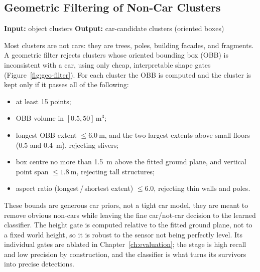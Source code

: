 \documentclass[a4paper,12pt]{report}
\begin{document}
\subsection{Geometric Filtering of Non-Car Clusters}
\label{sec:pipeline-geometric}

\noindent \textbf{Input:} object clusters \quad \textbar \quad \textbf{Output:} car-candidate clusters (oriented boxes) \vspace{0.5em}

Most clusters are not cars: they are trees, poles, building facades, and
fragments. A geometric filter rejects clusters whose oriented bounding box (OBB)
is inconsistent with a car, using only cheap, interpretable shape gates
(Figure~\ref{fig:geo-filter}). For each
cluster the OBB is computed and the cluster is kept only if it passes all
of the following:

\begin{itemize}
  \item at least \num{15} points;
  \item OBB volume in $[\num{0.5}, \num{50}]\,\si{\meter\cubed}$;
  \item longest OBB extent $\leq \SI{6.0}{\meter}$, and the two largest extents
    above small floors (\SI{0.5}{} and \SI{0.4}{\meter}), rejecting slivers;
  \item box centre no more than \SI{1.5}{\meter} above the fitted ground plane,
    and vertical point span $\leq \SI{1.8}{\meter}$, rejecting tall structures;
  \item aspect ratio (longest\,/\,shortest extent) $\leq \num{6.0}$, rejecting
    thin walls and poles.
\end{itemize}

These bounds are generous car priors, not a tight car model, they are meant to
remove obvious non-cars while leaving the fine car/not-car decision to the
learned classifier. The height gate is computed relative to the fitted
ground plane, not to a fixed world height, so it is robust to the sensor not
being perfectly level. Its individual gates are ablated in Chapter~\ref{ch:evaluation}; the stage is
high recall and low precision by construction, and the
classifier is what turns its survivors into precise detections.
\end{document}

